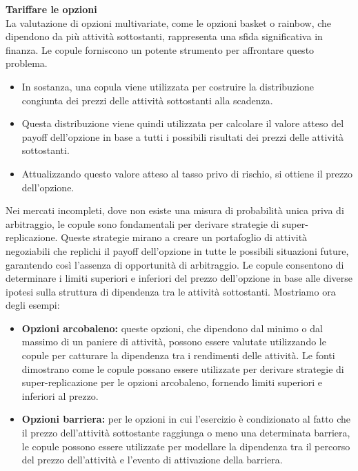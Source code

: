 \documentclass[a4paper,12pt]{article}
\begin{document}
\noindent \textbf{Tariffare le opzioni}\\

\noindent La valutazione di opzioni multivariate, come le opzioni basket o rainbow, che dipendono da più attività sottostanti, rappresenta una sfida significativa in finanza. Le copule forniscono un potente strumento per affrontare questo problema.
\begin{itemize}
	\item In sostanza, una copula viene utilizzata per costruire la distribuzione congiunta dei prezzi delle attività sottostanti alla scadenza.
	\item Questa distribuzione viene quindi utilizzata per calcolare il valore atteso del payoff dell'opzione in base a tutti i possibili risultati dei prezzi delle attività sottostanti.
	\item Attualizzando questo valore atteso al tasso privo di rischio, si ottiene il prezzo dell'opzione.
\end{itemize}

\noindent Nei mercati incompleti, dove non esiste una misura di probabilità unica priva di arbitraggio, le copule sono fondamentali per derivare strategie di super-replicazione. Queste strategie mirano a creare un portafoglio di attività negoziabili che replichi il payoff dell'opzione in tutte le possibili situazioni future, garantendo così l'assenza di opportunità di arbitraggio. Le copule consentono di determinare i limiti superiori e inferiori del prezzo dell'opzione in base alle diverse ipotesi sulla struttura di dipendenza tra le attività sottostanti.
Mostriamo ora degli esempi:
\begin{itemize}
	\item \textbf{Opzioni arcobaleno:} queste opzioni, che dipendono dal minimo o dal massimo di un paniere di attività, possono essere valutate utilizzando le copule per catturare la dipendenza tra i rendimenti delle attività. Le fonti dimostrano come le copule possano essere utilizzate per derivare strategie di super-replicazione per le opzioni arcobaleno, fornendo limiti superiori e inferiori al prezzo.
	\item \textbf{Opzioni barriera:} per le opzioni in cui l'esercizio è condizionato al fatto che il prezzo dell'attività sottostante raggiunga o meno una determinata barriera, le copule possono essere utilizzate per modellare la dipendenza tra il percorso del prezzo dell'attività e l'evento di attivazione della barriera.
\end{itemize}
\end{document}
